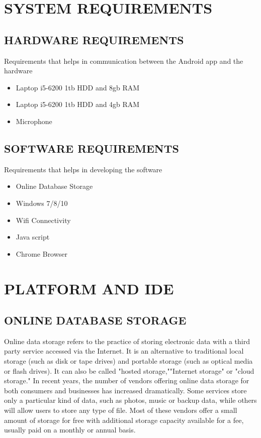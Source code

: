 \documentclass[11pt]{report} %
\begin{document}
\section{SYSTEM REQUIREMENTS}
\label{sec:SYSTEM REQUIREMENTS}


\subsection{HARDWARE REQUIREMENTS}
\label{subsec:HARDWARE REQUIREMENTS}
Requirements that helps in communication between the Android app and the hardware
\begin{itemize}
	\item Laptop i5-6200 1tb HDD and 8gb RAM
	\item Laptop i5-6200 1tb HDD and 4gb RAM
	\item Microphone
\end{itemize}

\subsection{SOFTWARE REQUIREMENTS}
\label{subsec:SOFTWARE REQUIREMENTS}
Requirements that helps in developing the software
\begin{itemize}
	\item Online Database Storage
	\item Windows 7/8/10
	\item Wifi Connectivity
	\item Java script
	\item Chrome Browser
\end{itemize}
\section{PLATFORM AND IDE}
\label{sec:PLATFORM AND IDE}


\subsection{ONLINE DATABASE STORAGE}
\label{subsec:ONLINE DATABASE STORAGE}
Online data storage refers to the practice of storing electronic data with a third party service accessed via the Internet. It is an alternative to traditional local storage (such as disk or tape drives) and portable storage (such as optical media or flash drives). It can also be called "hosted storage,""Internet storage" or "cloud storage."
In recent years, the number of vendors offering online data storage for both consumers and businesses has increased dramatically. Some services store only a particular kind of data, such as photos, music or backup data, while others will allow users to store any type of file. Most of these vendors offer a small amount of storage for free with additional storage capacity available for a fee, usually paid on a monthly or annual basis.
\end{document}
